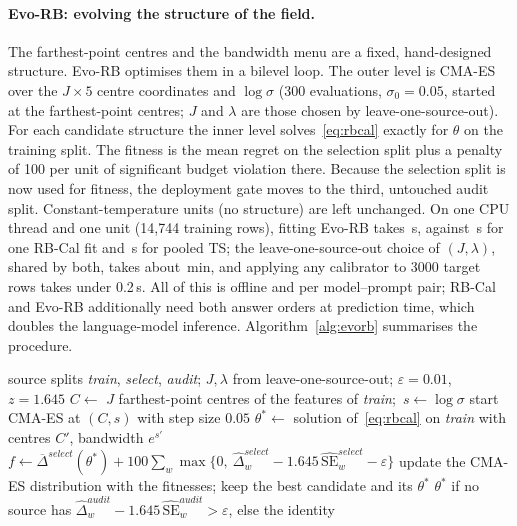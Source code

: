 \documentclass[runningheads]{llncs}
\begin{document}
\paragraph{Evo-RB: evolving the structure of the field.}
The farthest-point centres and the bandwidth menu are a fixed, hand-designed structure.
Evo-RB optimises them in a bilevel loop.
The outer level is CMA-ES over the $J\times5$ centre coordinates and $\log\sigma$ (300 evaluations, $\sigma_0=0.05$, started at the farthest-point centres; $J$ and $\lambda$ are those chosen by leave-one-source-out).
For each candidate structure the inner level solves~\eqref{eq:rbcal} exactly for $\theta$ on the training split.
The fitness is the mean regret on the selection split plus a penalty of 100 per unit of significant budget violation there.
Because the selection split is now used for fitness, the deployment gate moves to the third, untouched audit split.
Constant-temperature units (no structure) are left unchanged.
On one CPU thread and one unit (14{,}744 training rows), fitting Evo-RB takes \TimeEvo{}\,s, against \TimeRbFit{}\,s for one RB-Cal fit and \TimePooled{}\,s for pooled TS; the leave-one-source-out choice of $(J,\lambda)$, shared by both, takes about \TimeLosoMin{}\,min, and applying any calibrator to 3000 target rows takes under 0.2\,s.
All of this is offline and per model--prompt pair; RB-Cal and Evo-RB additionally need both answer orders at prediction time, which doubles the language-model inference.
Algorithm~\ref{alg:evorb} summarises the procedure.

\begin{algorithm}[t]
\caption{Evo-RB for one unit (model--prompt pair).}\label{alg:evorb}
\begin{algorithmic}[1]
\Require source splits \textit{train}, \textit{select}, \textit{audit}; $J,\lambda$ from leave-one-source-out; $\varepsilon=0.01$, $z=1.645$
\State $C\gets$ $J$ farthest-point centres of the features of \textit{train};\ $s\gets\log\sigma$
\State start CMA-ES at $(C,s)$ with step size $0.05$
    \State $\theta^\ast\gets$ solution of~\eqref{eq:rbcal} on \textit{train} with centres $C'$, bandwidth $e^{s'}$ 
    \State $f\gets\overline{\Delta}^{\textit{select}}(\theta^\ast)+100\sum_w\max\{0,\ \hat\Delta^{\textit{select}}_w-1.645\,\widehat{\mathrm{SE}}^{\textit{select}}_w-\varepsilon\}$
  \EndFor
  \State update the CMA-ES distribution with the fitnesses; keep the best candidate and its $\theta^\ast$
\EndWhile
\State \Return $\theta^\ast$ if no source has $\hat\Delta^{\textit{audit}}_w-1.645\,\widehat{\mathrm{SE}}^{\textit{audit}}_w>\varepsilon$, else the identity
\end{algorithmic}
\end{algorithm}
\end{document}
